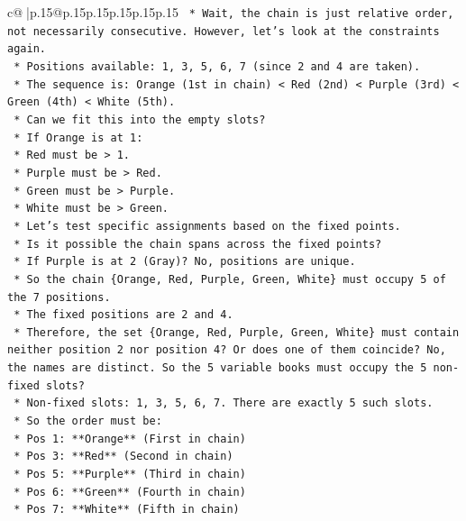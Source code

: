 \documentclass{article}
\begin{document}
{\begin{supertabular}{c@{$\;$}|p{.15\linewidth}@{}p{.15\linewidth}p{.15\linewidth}p{.15\linewidth}p{.15\linewidth}p{.15\linewidth}}
{{{\texttt{    *   Wait, the chain is just relative order, not necessarily consecutive. However, let's look at the constraints again.} \\
\texttt{    *   Positions available: 1, 3, 5, 6, 7 (since 2 and 4 are taken).} \\
\texttt{    *   The sequence is: Orange (1st in chain) < Red (2nd) < Purple (3rd) < Green (4th) < White (5th).} \\
\texttt{    *   Can we fit this into the empty slots?} \\
\texttt{        *   If Orange is at 1:} \\
\texttt{            *   Red must be > 1.} \\
\texttt{            *   Purple must be > Red.} \\
\texttt{            *   Green must be > Purple.} \\
\texttt{            *   White must be > Green.} \\
\texttt{        *   Let's test specific assignments based on the fixed points.} \\
\texttt{        *   Is it possible the chain spans across the fixed points?} \\
\texttt{            *   If Purple is at 2 (Gray)? No, positions are unique.} \\
\texttt{            *   So the chain \{Orange, Red, Purple, Green, White\} must occupy 5 of the 7 positions.} \\
\texttt{            *   The fixed positions are 2 and 4.} \\
\texttt{            *   Therefore, the set \{Orange, Red, Purple, Green, White\} must contain neither position 2 nor position 4? Or does one of them coincide? No, the names are distinct. So the 5 variable books must occupy the 5 non{-}fixed slots?} \\
\texttt{            *   Non{-}fixed slots: 1, 3, 5, 6, 7. There are exactly 5 such slots.} \\
\texttt{            *   So the order must be:} \\
\texttt{                *   Pos 1: **Orange** (First in chain)} \\
\texttt{                *   Pos 3: **Red** (Second in chain)} \\
\texttt{                *   Pos 5: **Purple** (Third in chain)} \\
\texttt{                *   Pos 6: **Green** (Fourth in chain)} \\
\texttt{                *   Pos 7: **White** (Fifth in chain)} \\
}}}
\end{supertabular}}
\end{document}
